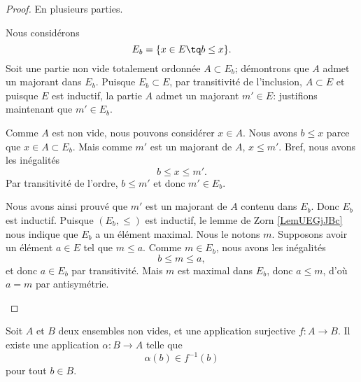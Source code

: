 \begin{proof}
	En plusieurs parties.
	\begin{subproof}
		\spitem[Un ensemble]
		Nous considérons
		\begin{equation}
			E_b=\{ x\in E\tq b\leq x \}.
		\end{equation}
		Soit une partie non vide totalement ordonnée \( A \subset E_b\); démontrons que \( A \) admet un majorant dans \( E_b \). Puisque \( E_b \subset E\), par transitivité de l'inclusion, \( A \subset E \) et puisque \( E\) est inductif, la partie \( A\) admet un majorant \( m'\in E\): justifions maintenant que \( m' \in E_b \).

		Comme \( A\) est non vide, nous pouvons considérer \( x\in A\). Nous avons \( b\leq x\) parce que \( x\in A\subset E_b\). Mais comme \( m'\) est un majorant de \( A\), \( x\leq m'\). Bref, nous avons les inégalités
		\begin{equation}
			b\leq x\leq m'.
		\end{equation}
		Par transitivité de l'ordre, \( b \leq m' \) et donc \( m'\in E_b\).

		Nous avons ainsi prouvé que \( m'\) est un majorant de \( A\) contenu dans \( E_b\). Donc \( E_b\) est inductif.
		\spitem[Zorn]
		Puisque \( (E_b,\leq)\) est inductif, le lemme de Zorn \ref{LemUEGjJBc} nous indique que \( E_b\) a un élément maximal. Nous le notons \( m\).
		Supposons avoir un élément \( a\in E\) tel que \( m\leq a\). Comme \( m \in E_b \), nous avons les inégalités
		\begin{equation}
			b\leq m\leq a,
		\end{equation}
		et donc \( a\in E_b\) par transitivité. Mais \( m\) est maximal dans \( E_b\), donc \( a \leq m \), d'où \( a=m\) par antisymétrie.
	\end{subproof}
\end{proof}


\begin{proposition}	\label{PROPooRHNFooHFUOEx}
	Soit \( A \) et \( B \) deux ensembles non vides, et une application surjective \(f \colon A\to B  \). Il existe une application \(\alpha \colon B\to A  \) telle que
	\begin{equation}
		\alpha(b)\in f^{-1}(b)
	\end{equation}
	pour tout \( b\in B\).
\end{proposition}

